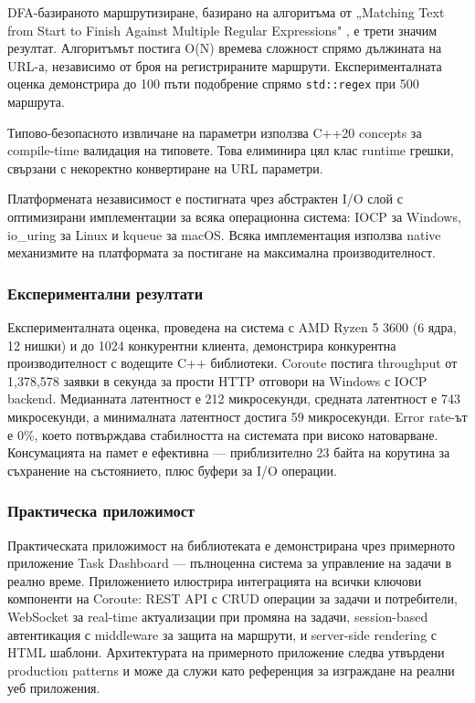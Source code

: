 DFA-базираното маршрутизиране, базирано на алгоритъма от „Matching Text from Start to Finish Against Multiple Regular Expressions" \cite{stankov2024regex}, е трети значим резултат. Алгоритъмът постига O(N) времева сложност спрямо дължината на URL-а, независимо от броя на регистрираните маршрути. Експерименталната оценка демонстрира до 100 пъти подобрение спрямо \texttt{std::regex} при 500 маршрута.

Типово-безопасното извличане на параметри използва C++20 concepts за compile-time валидация на типовете. Това елиминира цял клас runtime грешки, свързани с некоректно конвертиране на URL параметри.

Платформената независимост е постигната чрез абстрактен I/O слой с оптимизирани имплементации за всяка операционна система: IOCP за Windows, io\_uring за Linux и kqueue за macOS. Всяка имплементация използва native механизмите на платформата за постигане на максимална производителност.

\subsubsection{Експериментални резултати}

Експерименталната оценка, проведена на система с AMD Ryzen 5 3600 (6 ядра, 12 нишки) и до 1024 конкурентни клиента, демонстрира конкурентна производителност с водещите C++ библиотеки. Coroute постига throughput от 1,378,578 заявки в секунда за прости HTTP отговори на Windows с IOCP backend. Медианната латентност е 212 микросекунди, средната латентност е 743 микросекунди, а минималната латентност достига 59 микросекунди. Error rate-ът е 0\%, което потвърждава стабилността на системата при високо натоварване. Консумацията на памет е ефективна --- приблизително 23 байта на корутина за съхранение на състоянието, плюс буфери за I/O операции.

\subsubsection{Практическа приложимост}

Практическата приложимост на библиотеката е демонстрирана чрез примерното приложение Task Dashboard --- пълноценна система за управление на задачи в реално време. Приложението илюстрира интеграцията на всички ключови компоненти на Coroute: REST API с CRUD операции за задачи и потребители, WebSocket за real-time актуализации при промяна на задачи, session-based автентикация с middleware за защита на маршрути, и server-side rendering с HTML шаблони. Архитектурата на примерното приложение следва утвърдени production patterns и може да служи като референция за изграждане на реални уеб приложения.

